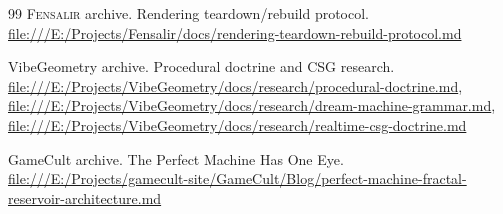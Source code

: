 \documentclass[11pt]{article}
\newcommand{\Fensalir}{\textsc{Fensalir}}
\begin{document}
\begin{thebibliography}{99}
\Fensalir{} archive.
\newblock Rendering teardown/rebuild protocol.
\newblock \url{file:///E:/Projects/Fensalir/docs/rendering-teardown-rebuild-protocol.md}

VibeGeometry archive.
\newblock Procedural doctrine and CSG research.
\newblock \url{file:///E:/Projects/VibeGeometry/docs/research/procedural-doctrine.md},
\url{file:///E:/Projects/VibeGeometry/docs/research/dream-machine-grammar.md},
\url{file:///E:/Projects/VibeGeometry/docs/research/realtime-csg-doctrine.md}

GameCult archive.
\newblock The Perfect Machine Has One Eye.
\newblock \url{file:///E:/Projects/gamecult-site/GameCult/Blog/perfect-machine-fractal-reservoir-architecture.md}

\end{thebibliography}
\end{document}
